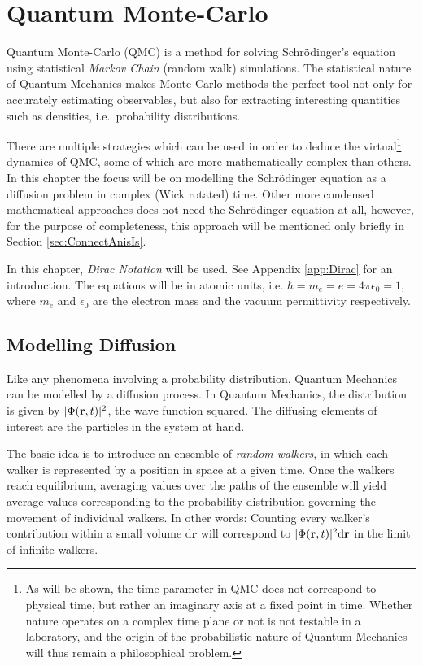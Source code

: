 \chapter{Quantum Monte-Carlo}
\label{ch:QMC}

Quantum Monte-Carlo (QMC) is a method for solving Schrödinger's equation using statistical \textit{Markov Chain} (random walk) simulations. The statistical nature of Quantum Mechanics makes Monte-Carlo methods the perfect tool not only for accurately estimating observables, but also for extracting interesting quantities such as densities, i.e.~probability distributions. 

There are multiple strategies which can be used in order to deduce the virtual\footnote{As will be shown, the time parameter in QMC does not correspond to physical time, but rather an imaginary axis at a fixed point in time. Whether nature operates on a complex time plane or not is not testable in a laboratory, and the origin of the probabilistic nature of Quantum Mechanics will thus remain a philosophical problem.} dynamics of QMC, some of which are more mathematically complex than others. In this chapter the focus will be on modelling the Schrödinger equation as a diffusion problem in complex (Wick rotated) time. Other more condensed mathematical approaches does not need the Schrödinger equation at all, however, for the purpose of completeness, this approach will be mentioned only briefly in Section \ref{sec:ConnectAnisIs}.

In this chapter, \textit{Dirac Notation} will be used. See Appendix \ref{app:Dirac} for an introduction. The equations will be in atomic units, i.e. $\hbar = m_e = e = 4\pi\epsilon_0 = 1$, where $m_e$ and $\epsilon_0$ are the electron mass and the vacuum permittivity respectively.

\section{Modelling Diffusion}

Like any phenomena involving a probability distribution, Quantum Mechanics can be modelled by a diffusion process. In Quantum Mechanics, the distribution is given by $|\Phi(\mathbf{r}, t)|^2$, the wave function squared. The diffusing elements of interest are the particles in the system at hand. 

The basic idea is to introduce an ensemble of \textit{random walkers}, in which each walker is represented by a position in space at a given time. Once the walkers reach equilibrium, averaging values over the paths of the ensemble will yield average values corresponding to the probability distribution governing the movement of individual walkers. In other words: Counting every walker's contribution within a small volume $\mathrm{d}\mathbf{r}$ will correspond to $|\Phi(\mathbf{r}, t)|^2\mathrm{d}\mathbf{r}$ in the limit of infinite walkers.

